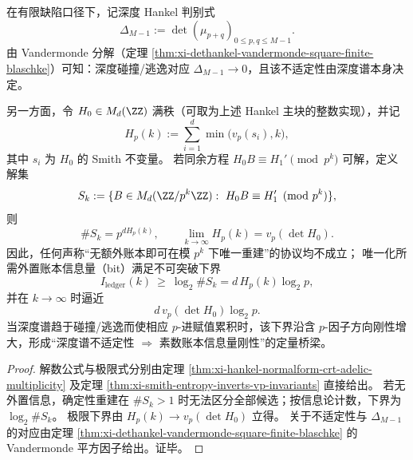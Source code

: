 \begin{conclusion}[深度谱不适定性与素数账本信息量下界]\label{con:xi-depth-illposedness-prime-ledger-information-lower-bound}
在有限缺陷口径下，记深度 Hankel 判别式
\[
\Delta_{M-1}:=\det(\mu_{p+q})_{0\le p,q\le M-1}.
\]
由 Vandermonde 分解（定理 \ref{thm:xi-dethankel-vandermonde-square-finite-blaschke}）可知：深度碰撞/逃逸对应 \(\Delta_{M-1}\to 0\)，且该不适定性由深度谱本身决定。
\par
另一方面，令 \(H_0\in M_d(\ZZ)\) 满秩（可取为上述 Hankel 主块的整数实现），并记
\[
H_p(k):=\sum_{i=1}^d\min\bigl(v_p(s_i),k\bigr),
\]
其中 \(s_i\) 为 \(H_0\) 的 Smith 不变量。
若同余方程 \(H_0B\equiv H_1'\pmod{p^k}\) 可解，定义解集
\[
S_k:=\{B\in M_d(\ZZ/p^k\ZZ):\ H_0B\equiv H_1'\pmod{p^k}\},
\]
则
\[
\#S_k=p^{dH_p(k)},
\qquad
\lim_{k\to\infty}H_p(k)=v_p(\det H_0).
\]
因此，任何声称“无额外账本即可在模 \(p^k\) 下唯一重建”的协议均不成立；
唯一化所需外置账本信息量（bit）满足不可突破下界
\[
I_{\mathrm{ledger}}(k)\ \ge\ \log_2\#S_k
=d\,H_p(k)\log_2 p,
\]
并在 \(k\to\infty\) 时逼近
\[
d\,v_p(\det H_0)\log_2 p.
\]
当深度谱趋于碰撞/逃逸而使相应 \(p\)-进赋值累积时，该下界沿含 \(p\)-因子方向刚性增大，形成“深度谱不适定性 \(\Rightarrow\) 素数账本信息量刚性”的定量桥梁。
\end{conclusion}
\begin{proof}
解数公式与极限式分别由定理 \ref{thm:xi-hankel-normalform-crt-adelic-multiplicity} 及定理 \ref{thm:xi-smith-entropy-inverts-vp-invariants} 直接给出。
若无外置信息，确定性重建在 \(\#S_k>1\) 时无法区分全部候选；按信息论计数，下界为 \(\log_2\#S_k\)。
极限下界由 \(H_p(k)\to v_p(\det H_0)\) 立得。
关于不适定性与 \(\Delta_{M-1}\) 的对应由定理 \ref{thm:xi-dethankel-vandermonde-square-finite-blaschke} 的 Vandermonde 平方因子给出。证毕。
\end{proof}


